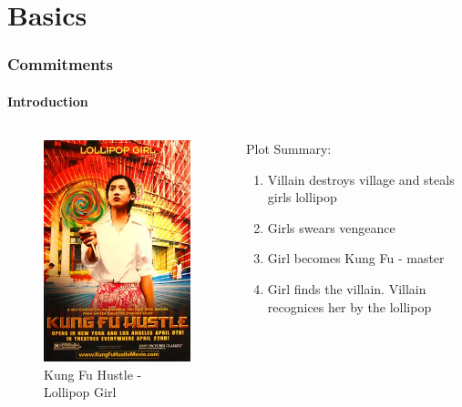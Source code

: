 \section{Basics}

\begin{frame}
	\frametitle{Commitments}
	\framesubtitle{Introduction}
	\begin{columns}
		\begin{column}{0.5\textwidth}
			\begin{figure}
				\centering
				\includegraphics[width=0.8\linewidth]{Images/lollipop}
				\caption{Kung Fu Hustle - Lollipop Girl}
				\label{fig:lollipop}
			\end{figure}
		\end{column}
		\begin{column}{0.5\textwidth}
			\begin{Large}
				Plot Summary:
				\begin{enumerate}
					\item Villain destroys village and steals girls lollipop
					\item Girls swears vengeance
					\item Girl becomes Kung Fu - master
					\item Girl finds the villain. Villain recognices her by the lollipop	
				\end{enumerate}
			\end{Large}
		\end{column}
	\end{columns}
\end{frame}

